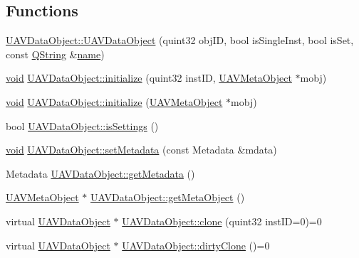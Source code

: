 \subsection*{Functions}
\begin{DoxyCompactItemize}
\item 
\hyperlink{group___u_a_v_objects_plugin_ga98ff6f0f25a431f4efce59fcbe9176e5}{U\-A\-V\-Data\-Object\-::\-U\-A\-V\-Data\-Object} (quint32 obj\-I\-D, bool is\-Single\-Inst, bool is\-Set, const \hyperlink{group___u_a_v_objects_plugin_gab9d252f49c333c94a72f97ce3105a32d}{Q\-String} \&\hyperlink{glext_8h_ad977737dfc9a274a62741b9500c49a32}{name})
\item 
\hyperlink{group___u_a_v_objects_plugin_ga444cf2ff3f0ecbe028adce838d373f5c}{void} \hyperlink{group___u_a_v_objects_plugin_ga9f3e150d973455c643bc5f582433cd51}{U\-A\-V\-Data\-Object\-::initialize} (quint32 inst\-I\-D, \hyperlink{class_u_a_v_meta_object}{U\-A\-V\-Meta\-Object} $\ast$mobj)
\item 
\hyperlink{group___u_a_v_objects_plugin_ga444cf2ff3f0ecbe028adce838d373f5c}{void} \hyperlink{group___u_a_v_objects_plugin_ga15063ab51e35069afd31709cc2f43276}{U\-A\-V\-Data\-Object\-::initialize} (\hyperlink{class_u_a_v_meta_object}{U\-A\-V\-Meta\-Object} $\ast$mobj)
\item 
bool \hyperlink{group___u_a_v_objects_plugin_ga77932d3af8bd55182bbc39af1f01f447}{U\-A\-V\-Data\-Object\-::is\-Settings} ()
\item 
\hyperlink{group___u_a_v_objects_plugin_ga444cf2ff3f0ecbe028adce838d373f5c}{void} \hyperlink{group___u_a_v_objects_plugin_ga968c4e54cd5088bed83546338e44de6b}{U\-A\-V\-Data\-Object\-::set\-Metadata} (const Metadata \&mdata)
\item 
Metadata \hyperlink{group___u_a_v_objects_plugin_ga8c0434ba77ed0cfbcc2306bdc6b0248c}{U\-A\-V\-Data\-Object\-::get\-Metadata} ()
\item 
\hyperlink{class_u_a_v_meta_object}{U\-A\-V\-Meta\-Object} $\ast$ \hyperlink{group___u_a_v_objects_plugin_gae14c5b7e20f137db436d3c1e7d1949ec}{U\-A\-V\-Data\-Object\-::get\-Meta\-Object} ()
\item 
virtual \hyperlink{class_u_a_v_data_object}{U\-A\-V\-Data\-Object} $\ast$ \hyperlink{group___u_a_v_objects_plugin_ga9c113847ecf6bd99cf7efe3535620e66}{U\-A\-V\-Data\-Object\-::clone} (quint32 inst\-I\-D=0)=0
\item 
virtual \hyperlink{class_u_a_v_data_object}{U\-A\-V\-Data\-Object} $\ast$ \hyperlink{group___u_a_v_objects_plugin_gae075ec1715d23e8bff81e913bc1dd303}{U\-A\-V\-Data\-Object\-::dirty\-Clone} ()=0

\end{DoxyCompactItemize}
